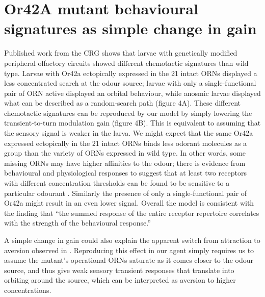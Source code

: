 \documentclass[10pt,a4paper]{article}
\begin{document}
\section{Or42A mutant behavioural signatures as simple change in gain}
Published work from the CRG shows that larvae with genetically modified peripheral olfactory circuits showed different chemotactic signatures than wild type. Larvae with Or42a ectopically expressed in the 21 intact ORNs displayed a less concentrated search at the odour source; larvae with only a single-functional pair of ORN active displayed an orbital behaviour, while anosmic larvae displayed what can be described as a random-search path (figure 4A). These different chemotactic signatures can be reproduced by our model by simply lowering the transient-to-turn modulation gain (figure 4B). This is equivalent to assuming that the sensory signal is weaker in the larva. We might expect that the same Or42a expressed ectopically in the 21 intact ORNs binds less odorant molecules as a group than the variety of ORNs expressed in wild type. In other words, some missing ORNs may have higher affinities to the odour; there is evidence from behavioural and physiological responses to suggest that at least two receptors with different concentration thresholds can be found to be sensitive to a particular odourant \citep{kreher2008translation}. Similarly the presence of only a single-functional pair of Or42a might result in an even lower signal. Overall the model is consistent with the finding that ``the summed response of the entire receptor repertoire correlates with the strength of the behavioural response.” \citep{kreher2008translation} 

A simple change in gain could also explain the apparent switch from attraction to aversion observed in \citep{gomez2011active, kreher2008translation}. Reproducing this effect in our agent simply requires us to assume the mutant's operational ORNs saturate as it comes closer to the odour source, and thus give weak sensory transient responses that translate into orbiting around the source, which can be interpreted as aversion to higher concentrations. 
\end{document}
